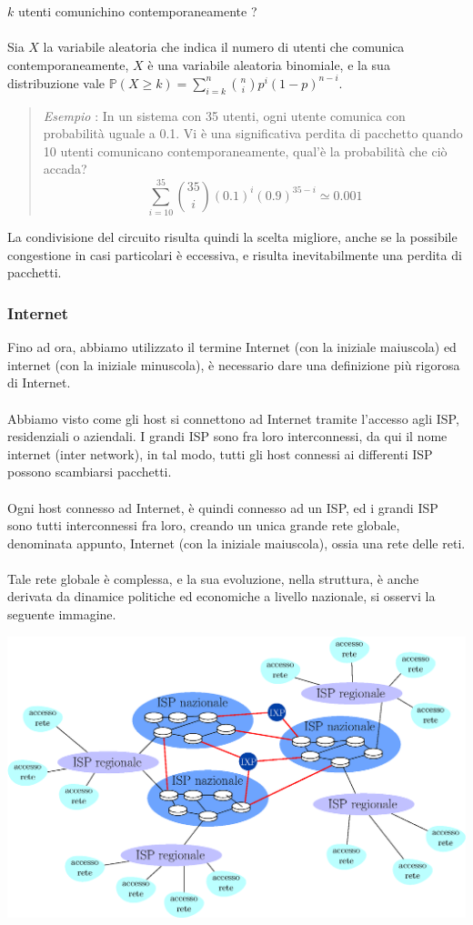 \documentclass[12pt, letterpaper]{article}
\newcommand{\acc}{\\\hphantom{}\\}
\begin{document}
$k$ utenti comunichino contemporaneamente ?\acc  Sia $X$ la variabile aleatoria che indica il numero di utenti che comunica
contemporaneamente, $X$ è una variabile aleatoria binomiale, e la sua distribuzione vale
$\displaystyle\mathbb{P}(X\ge k)=\sum_{i=k}^n\binom{n}{i}p^i(1-p)^{n-i}$.\begin{quote}
    \color{gray} \textit{Esempio} : In un sistema con 35 utenti, ogni utente comunica con probabilità uguale a 0.1.
    Vi è una significativa perdita di pacchetto quando 10 utenti comunicano contemporaneamente, qual'è la probabilità che
    ciò accada? $$\sum_{i=10}^{35}\binom{35}{i}(0.1)^i(0.9)^{35-i}\simeq0.001$$
    \color{black}
\end{quote}
La condivisione del circuito risulta quindi la scelta migliore, anche se la possibile congestione in casi particolari
è eccessiva, e risulta inevitabilmente una perdita di pacchetti.\subsubsection{Internet}
Fino ad ora, abbiamo utilizzato il termine Internet (con la iniziale maiuscola) ed internet (con la iniziale minuscola), è necessario
dare una definizione più rigorosa di Internet.\acc
Abbiamo visto come gli host si connettono ad Internet tramite l'accesso agli ISP, residenziali o aziendali. I grandi ISP sono fra
loro interconnessi, da qui il nome internet (inter network), in tal modo, tutti gli host connessi ai differenti ISP possono
scambiarsi pacchetti.\acc Ogni host connesso ad Internet, è quindi connesso ad un ISP, ed i grandi ISP sono tutti interconnessi fra loro,
creando un unica grande rete globale, denominata appunto, Internet (con la iniziale maiuscola), ossia una rete delle reti.\acc
Tale rete globale è complessa, e la sua evoluzione, nella struttura, è anche derivata da dinamice politiche ed economiche a livello
nazionale, si osservi la seguente immagine.\begin{center}
    \includegraphics[width=1\textwidth ]{images/Internet.eps}
\end{center}
\end{document}
